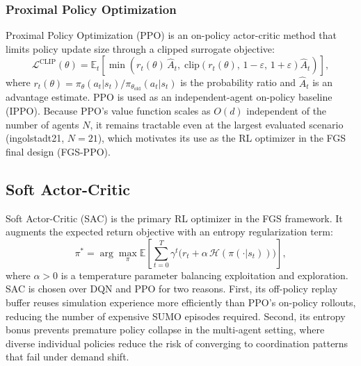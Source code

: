 \subsubsection{Proximal Policy Optimization}
\label{sec:Methodology_PPO}

Proximal Policy Optimization (PPO) \citep{schulman2017proximal} is an on-policy actor-critic method that limits policy update size through a clipped surrogate objective:
\begin{equation}
  \mathcal{L}^{\mathrm{CLIP}}(\theta) =
    \mathbb{E}_t\!\left[
      \min\!\left(
        r_t(\theta)\,\hat{A}_t,\;
        \mathrm{clip}\!\left(r_t(\theta),\,1-\varepsilon,\,1+\varepsilon\right)\hat{A}_t
      \right)
    \right],
\end{equation}
where $r_t(\theta) = \pi_\theta(a_t|s_t) / \pi_{\theta_{\mathrm{old}}}(a_t|s_t)$ is the probability ratio and $\hat{A}_t$ is an advantage estimate. PPO is used as an independent-agent on-policy baseline (IPPO). Because PPO's value function scales as $O(d)$ independent of the number of agents $N$, it remains tractable even at the largest evaluated scenario (ingolstadt21, $N=21$), which motivates its use as the RL optimizer in the FGS final design (FGS-PPO).

\subsection{Soft Actor-Critic}
\label{sec:Methodology_SAC}

Soft Actor-Critic (SAC) \citep{haarnoja2018soft} is the primary RL optimizer in the FGS framework. It augments the expected return objective with an entropy regularization term:
\begin{equation}
  \pi^* = \arg\max_\pi \mathbb{E}\!\left[
    \sum_{t=0}^{T} \gamma^t
    \bigl(r_t + \alpha\,\mathcal{H}(\pi(\cdot|s_t))\bigr)
  \right],
  \label{eq:sac_objective}
\end{equation}
where $\alpha > 0$ is a temperature parameter balancing exploitation and exploration. SAC is chosen over DQN and PPO for two reasons. First, its off-policy replay buffer reuses simulation experience more efficiently than PPO's on-policy rollouts, reducing the number of expensive SUMO episodes required. Second, its entropy bonus prevents premature policy collapse in the multi-agent setting, where diverse individual policies reduce the risk of converging to coordination patterns that fail under demand shift.

